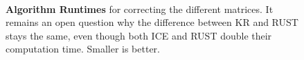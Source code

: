 
\begin{figure}[!htbp]
    \begin{centering}
         \\
        \caption[Algorithm Runtimes]
        {\textbf{Algorithm Runtimes} for correcting the different matrices. It
        remains an open question why the difference between KR and RUST stays the
        same, even though both ICE and RUST double their computation time. Smaller
        is better.}
        \label{fig:runtime}
    \end{centering}
\end{figure}

